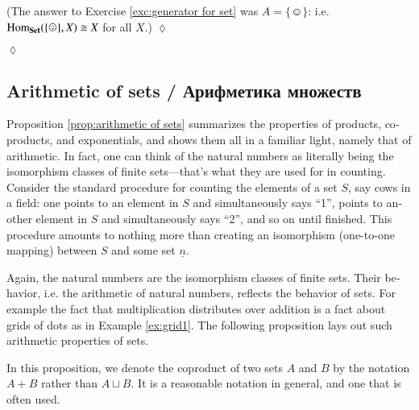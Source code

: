 \documentclass[a4paper]{book}
\def\tn{\textnormal}
\def\Hom{\tn{Hom}}
\def\singleton{\{\smiley\}}
\def\iso{\cong}
\def\ul{\underline}
\def\Set{{\bf Set}}
\theoremstyle{myth}
\newtheorem{excENG}[envENG]{\begin{english}Exercise\end{english}}
\newenvironment{exerciseENG}{\begin{excENG}}{\hspace*{\fill}$\lozenge$\end{excENG}}
\newtheorem{excRUS}[envRUS]{\begin{russian}Упражнение\end{russian}}
\newenvironment{exerciseRUS}{\begin{excRUS}}{\hspace*{\fill}$\lozenge$\end{excRUS}}
\begin{document}
\begin{english}
\begin{exerciseENG}
(The answer to Exercise \ref{exc:generator for set} was $A=\singleton$: i.e. $\Hom_\Set(\singleton,X)\iso X$ for all $X$.)
\end{exerciseENG}

\begin{exerciseRUS}\label{exc:two R2s}
\begin{russian} \end{russian}
\end{exerciseRUS}


\subsection{Arithmetic of sets / Арифметика множеств}\label{sec:arithmetic of sets}

Proposition \ref{prop:arithmetic of sets} summarizes the properties of products, coproducts, and exponentials, and shows them all in a familiar light, namely that of arithmetic. In fact, one can think of the natural numbers as literally being the isomorphism classes of finite sets---that's what they are used for in counting. Consider the standard procedure for counting the elements of a set $S$, say cows in a field: one points to an element in $S$ and simultaneously says “1”, points to another element in $S$ and simultaneously says “2”, and so on until finished. This procedure amounts to nothing more than creating an isomorphism (one-to-one mapping) between $S$ and some set $\ul{n}$. 

\begin{russian} \end{russian}

Again, the natural numbers are the isomorphism classes of finite sets. Their behavior, i.e. the arithmetic of natural numbers, reflects the behavior of sets. For example the fact that multiplication distributes over addition is a fact about grids of dots as in Example \ref{ex:grid1}. The following proposition lays out such arithmetic properties of sets.

\begin{russian} \end{russian}

In this proposition, we denote the coproduct of two sets $A$ and $B$ by the notation $A+B$ rather than $A\sqcup B$. It is a reasonable notation in general, and one that is often used. 

\begin{russian} \end{russian}


\end{english}
\end{document}
